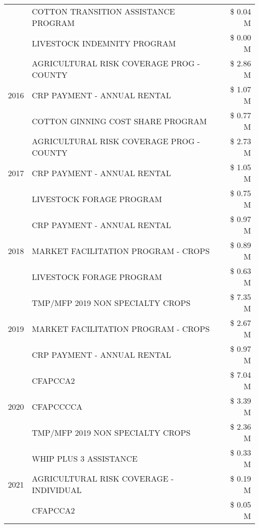 \begin{tabular}{llr}
 & COTTON TRANSITION ASSISTANCE PROGRAM & \$ 0.04 M \\
 & LIVESTOCK INDEMNITY PROGRAM & \$ 0.00 M \\
\cline{1-3}
\multirow[t]{3}{*}{2016} & AGRICULTURAL RISK COVERAGE PROG - COUNTY & \$ 2.86 M \\
 & CRP PAYMENT - ANNUAL RENTAL & \$ 1.07 M \\
 & COTTON GINNING COST SHARE PROGRAM & \$ 0.77 M \\
\cline{1-3}
\multirow[t]{3}{*}{2017} & AGRICULTURAL RISK COVERAGE PROG - COUNTY & \$ 2.73 M \\
 & CRP PAYMENT - ANNUAL RENTAL & \$ 1.05 M \\
 & LIVESTOCK FORAGE PROGRAM & \$ 0.75 M \\
\cline{1-3}
\multirow[t]{3}{*}{2018} & CRP PAYMENT - ANNUAL RENTAL & \$ 0.97 M \\
 & MARKET FACILITATION PROGRAM - CROPS & \$ 0.89 M \\
 & LIVESTOCK FORAGE PROGRAM & \$ 0.63 M \\
\cline{1-3}
\multirow[t]{3}{*}{2019} & TMP/MFP 2019 NON SPECIALTY CROPS & \$ 7.35 M \\
 & MARKET FACILITATION PROGRAM - CROPS & \$ 2.67 M \\
 & CRP PAYMENT - ANNUAL RENTAL & \$ 0.97 M \\
\cline{1-3}
\multirow[t]{3}{*}{2020} & CFAPCCA2 & \$ 7.04 M \\
 & CFAPCCCCA & \$ 3.39 M \\
 & TMP/MFP 2019 NON SPECIALTY CROPS & \$ 2.36 M \\
\cline{1-3}
\multirow[t]{3}{*}{2021} & WHIP PLUS 3 ASSISTANCE & \$ 0.33 M \\
 & AGRICULTURAL RISK COVERAGE - INDIVIDUAL & \$ 0.19 M \\
 & CFAPCCA2 & \$ 0.05 M \\
\cline{1-3}
\bottomrule
\end{tabular}
